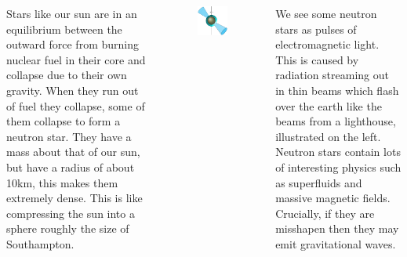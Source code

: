 \documentclass[20pt, a1paper, portrait, margin=0mm, innermargin=10mm,
    titleinnersep=0mm, blocktitleinnersep=0mm,
    blocktitlewidthratio=08, blocktitlemaxwidth=35cm ,blockbodyinnersep=8mm,
    blockverticalspace=10mm,colspace=5mm, subcolspace=0mm,noteinnersep=3mm]
{tikzposter}
\begin{document}
\begin{columns}
{Stars like our sun are in an equilibrium between the outward force from burning
nuclear fuel in their core and collapse due to their own gravity.  When they
run out of fuel they collapse, some of them collapse to form a neutron star.
They have a mass about that of our sun, but have a radius of about 10km, this
makes them extremely dense. This is like compressing the sun into a sphere
roughly the size of Southampton.
\vspace{4mm}
\begin{figure}
    \vspace{-15mm}
\begin{tikzfigure}
\centering
\includegraphics[width=\linewidth]{img/star-crop}
\end{tikzfigure}
\end{figure}

We see some neutron stars as pulses of electromagnetic light. This is caused by
radiation streaming out in thin beams which flash over the earth like the beams
from a lighthouse, illustrated on the left.  Neutron stars contain lots of
interesting physics such as superfluids and massive magnetic fields. Crucially,
if they are misshapen then they may emit gravitational waves. 
\vspace{2.3mm}
}

\end{columns}
\end{document}
